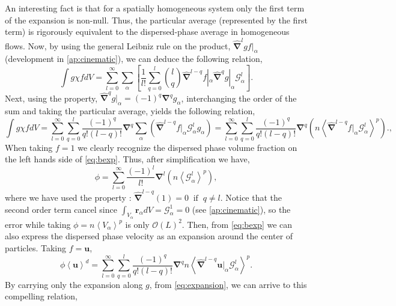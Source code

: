 An interesting fact is that for a spatially homogeneous system only the first term of the expansion is non-null. 
Thus, the particular average (represented by the first term) is rigorously equivalent to the dispersed-phase average in homogeneous flows. 
Now, by using the general Leibniz rule on the product, $\hat{\bm{\nabla}}^l gf|_\alpha$ (development in \ref{ap:cinematic}), we can deduce the following relation,
\begin{equation}
    \int g \chi f  dV 
    = \sum_{l=0}^\infty \sum_\alpha \left[\frac{1}{l!} \sum_{q = 0}^l \binom{l}{q} \hat{\bm{\nabla}}^{l-q}f|_\alpha \hat{\bm{\nabla}}^q g|_\alpha \mathcal{G}_\alpha^l\right].
\end{equation}
Next, using the property, $\hat{\bm{\nabla}}^{q} g|_\alpha = (-1)^q \bm{\nabla}^{q} g_\alpha$, interchanging the order of the sum and taking the particular average, yields the following relation,
\begin{equation}
    \int g \chi f  dV 
    = \sum_{l=0}^\infty \sum_{q = 0}^l \frac{(-1)^q}{q!(l-q)!}  \bm{\nabla}^q  \sum_\alpha \left(\hat{\bm{\nabla}}^{l-q} f|_\alpha \mathcal{G}_\alpha^l g_\alpha\right)
    = \sum_{l=0}^\infty \sum_{q = 0}^l \frac{(-1)^q}{q!(l-q)!}  \bm{\nabla}^q \left( n \left<\hat{\bm{\nabla}}^{l-q} f|_\alpha \mathcal{G}_\alpha^l\right>^p\right).
    \label{eq:bexp},
\end{equation}
When taking $f = 1$ we clearly recognize the dispersed phase volume fraction on the left hands side of \ref{eq:bexp}.
Thus, after simplification we have,
\begin{equation}
    \phi
    = \sum_{l=0}^\infty \frac{(-1)^l}{l!}  \bm{\nabla}^l \left( n \left<\mathcal{G}_\alpha^l\right>^p\right),
\end{equation}
where we have used the property : $\hat{\bm{\nabla}}^{l-q} (1)= 0 \;\; \text{if}\;\; q \neq l$. 
Notice that the second order term cancel since $\int_{V_\alpha} \bm{r}_\alpha dV= \mathcal{G}_\alpha^1 = 0$ (see \ref{ap:cinematic}), so the error while taking $\phi = n \left<V_\alpha\right>^p$ is only $\mathcal{O}\left(L\right)^2$.
Then, from \ref{eq:bexp} we can also express the dispersed phase velocity as an expansion around the center of particles. 
Taking $f = \bm{u}$,
\begin{equation}
    \phi\left<\bm{u}\right>^d 
    = \sum_{l=0}^\infty \sum_{q = 0}^l \frac{(-1)^q}{q!(l-q)!}  \bm{\nabla}^q  n \left<\hat{\bm{\nabla}}^{l-q} \bm{u}|_\alpha \mathcal{G}_\alpha^l\right>^p.
\end{equation}
By carrying only the expansion along $g$, from \ref{eq:expansion}, we can arrive to this compelling relation,
